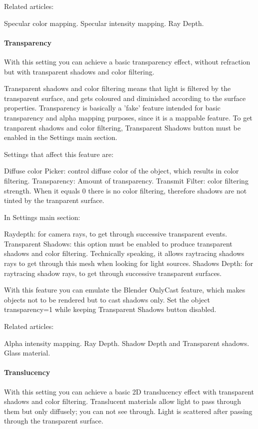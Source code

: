 Related articles:

Specular color mapping.
Specular intensity mapping.
Ray Depth.

\paragraph{Transparency}

With this setting you can achieve a basic transparency effect, without refraction but with transparent shadows and color filtering.

Transparent shadows and color filtering means that light is filtered by the transparent surface, and gets coloured and diminished according to the surface properties. Transparency is basically a 'fake' feature intended for basic transparency and alpha mapping purposes, since it is a mappable feature. To get tranparent shadows and color filtering, Transparent Shadows button must be enabled in the Settings main section.

Settings that affect this feature are:

Diffuse color Picker: control diffuse color of the object, which results in color filtering.
Transparency: Amount of transparency.
Transmit Filter: color filtering strength. When it equals 0 there is no color filtering, therefore shadows are not tinted by the tranparent surface.

In Settings main section:

Raydepth: for camera rays, to get through successive transparent events.
Transparent Shadows: this option must be enabled to produce transparent shadows and color filtering. Technically speaking, it allows raytracing shadows rays to get through this mesh when looking for light sources.
Shadows Depth: for raytracing shadow rays, to get through successive transparent surfaces.

With this feature you can emulate the Blender OnlyCast feature, which makes objects not to be rendered but to cast shadows only. Set the object transparency=1 while keeping Transparent Shadows button disabled.

Related articles:

Alpha intensity mapping.
Ray Depth.
Shadow Depth and Transparent shadows.
Glass material.


\paragraph{Translucency}

With this setting you can achieve a basic 2D translucency effect with transparent shadows and color filtering. Translucent materials allow light to pass through them but only diffusely; you can not see through. Light is scattered after passing through the transparent surface.

